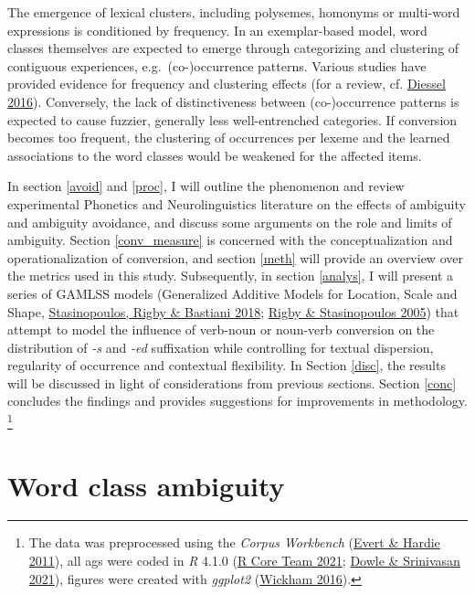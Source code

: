\documentclass[
]{article}
\begin{document}
The emergence of lexical clusters, including polysemes, homonyms or
multi-word expressions is conditioned by frequency. In an exemplar-based
model, word classes themselves are expected to emerge through
categorizing and clustering of contiguous experiences,
e.g.~(co-)occurrence patterns. Various studies have provided evidence
for frequency and clustering effects (for a review, cf.
\protect\hyperlink{ref-diessel16}{Diessel 2016}). Conversely, the lack
of distinctiveness between (co-)occurrence patterns is expected to cause
fuzzier, generally less well-entrenched categories. If conversion
becomes too frequent, the clustering of occurrences per lexeme and the
learned associations to the word classes would be weakened for the
affected items.

In section \ref{avoid} and \ref{proc}, I will outline the phenomenon and
review experimental Phonetics and Neurolinguistics literature on the
effects of ambiguity and ambiguity avoidance, and discuss some arguments
on the role and limits of ambiguity. Section \ref{conv_measure} is
concerned with the conceptualization and operationalization of
conversion, and section \ref{meth} will provide an overview over the
metrics used in this study. Subsequently, in section \ref{analys}, I
will present a series of GAMLSS models (Generalized Additive Models for
Location, Scale and Shape,
\protect\hyperlink{ref-stasinopoulos18}{Stasinopoulos, Rigby \& Bastiani
2018}; \protect\hyperlink{ref-gamlss}{Rigby \& Stasinopoulos 2005}) that
attempt to model the influence of verb-noun or noun-verb conversion on
the distribution of \emph{-s} and \emph{-ed} suffixation while
controlling for textual dispersion, regularity of occurrence and
contextual flexibility. In Section \ref{disc}, the results will be
discussed in light of considerations from previous sections. Section
\ref{conc} concludes the findings and provides suggestions for
improvements in methodology. \footnote{The data was preprocessed using
  the \emph{Corpus Workbench} (\protect\hyperlink{ref-cwb}{Evert \&
  Hardie 2011}), all ags were coded in \emph{R} 4.1.0
  (\protect\hyperlink{ref-R_base}{R Core Team 2021};
  \protect\hyperlink{ref-data.table}{Dowle \& Srinivasan 2021}), figures
  were created with \emph{ggplot2}
  (\protect\hyperlink{ref-ggplot}{Wickham 2016}).}

\hypertarget{word-class-ambiguity}{%
\section{Word class ambiguity}\label{word-class-ambiguity}}
\end{document}

